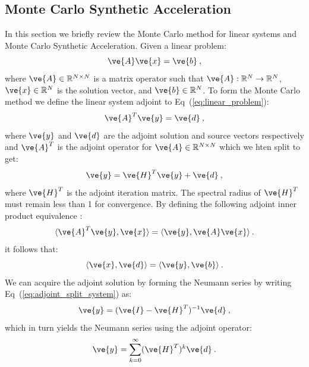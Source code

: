 \documentclass[letterpaper,11pt]{article}
\begin{document}
\subsection{Monte Carlo Synthetic Acceleration}
\label{subsec:mcsa}
In this section we briefly review the Monte Carlo method for linear
systems and Monte Carlo Synthetic Acceleration. Given a linear
problem:
\begin{equation}
  \ve{A} \ve{x} = \ve{b}\:,
  \label{eq:linear_problem}
\end{equation}
where $\ve{A} \in \mathbb{R}^{N \times N}$ is a matrix operator such
that $\ve{A} : \mathbb{R}^{N} \rightarrow \mathbb{R}^{N}$, $\ve{x} \in
\mathbb{R}^N$ is the solution vector, and $\ve{b} \in
\mathbb{R}^N$. To form the Monte Carlo method we define the linear
system adjoint to Eq~(\ref{eq:linear_problem}):
\begin{equation}
  \ve{A}^T \ve{y} = \ve{d}\:,
  \label{eq:adjoint_linear_problem}
\end{equation}
where $\ve{y}$ and $\ve{d}$ are the adjoint solution and source
vectors respectively and $\ve{A}^T$ is the adjoint operator for
$\ve{A} \in \mathbb{R}^{N \times N}$ which we hten split to get:
\begin{equation}
  \ve{y} = \ve{H}^T \ve{y} + \ve{d}\:,
  \label{eq:adjoint_split_system}
\end{equation}
where $\ve{H}^T$ is the adjoint iteration matrix. The spectral radius
of $\ve{H}^T$ must remain less than 1 for convergence. By defining the
following adjoint inner product equivalence \cite{spanier_monte_1969}:
\begin{equation}
  \langle \ve{A}^T \ve{y}, \ve{x} \rangle = \langle \ve{y}, \ve{A}
  \ve{x} \rangle\:.
  \label{eq:adjoint_operator_product}
\end{equation}
it follows that:
\begin{equation}
  \langle \ve{x}, \ve{d} \rangle = \langle \ve{y}, \ve{b} \rangle\:.
  \label{eq:adjoint_vector_relation}
\end{equation}
We can acquire the adjoint solution by forming the Neumann series by
writing Eq~(\ref{eq:adjoint_split_system}) as:
\begin{equation}
  \ve{y} = (\ve{I} - \ve{H}^T)^{-1} \ve{d}\:,
  \label{eq:adjoint_split_system_2}
\end{equation}
which in turn yields the Neumann series using the adjoint operator:
\begin{equation}
  \ve{y} = \sum_{k=0}^{\infty} (\ve{H}^T)^k\ve{d}\:.
  \label{eq:adjoint_neumann_series}
\end{equation}
\end{document}
